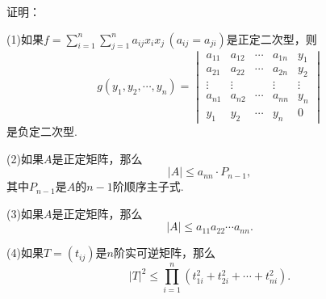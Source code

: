 \begin{prob}[10]
	证明：

	(1)如果$f=\displaystyle\sum_{i=1}^{n}\sum_{j=1}^{n}a_{ij}x_ix_j\,(a_{ij}=a_{ji})$是正定二次型，则
	\[
		g(y_1,y_2,\cdots,y_n)=\begin{vmatrix}
			a_{11} & a_{12} & \cdots & a_{1n} & y_1    \\
			a_{21} & a_{22} & \cdots & a_{2n} & y_2    \\
			\vdots & \vdots &        & \vdots & \vdots \\
			a_{n1} & a_{n2} & \cdots & a_{nn} & y_n    \\
			y_1    & y_2    & \cdots & y_n    & 0
		\end{vmatrix}
	\]
	是负定二次型.

	(2)如果$A$是正定矩阵，那么
	\[
		|A|\le a_{nn}\cdot P_{n-1},
	\]
	其中$P_{n-1}$是$A$的$n-1$阶顺序主子式.

	(3)如果$A$是正定矩阵，那么
	\[
		|A|\le a_{11}a_{22}\cdots a_{nn}.
	\]

	(4)如果$T=(t_{ij})$是$n$阶实可逆矩阵，那么\footnotemark
	\[
		|T|^2\le\prod_{i=1}^n(t_{1i}^2+t_{2i}^2+\cdots+t_{ni}^2).
	\]
\end{prob}
